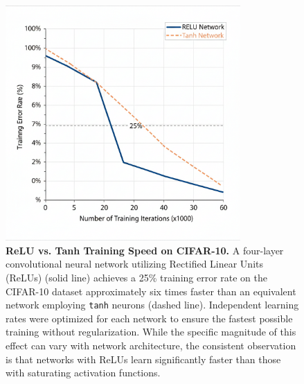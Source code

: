 \documentclass{article}
\begin{document}
\begin{figure}[h!]
    \centering
    \includegraphics[width=0.8\textwidth]{images/reluvstanhplot.png}
    \caption{
        \textbf{ReLU vs. Tanh Training Speed on CIFAR-10.} A four-layer convolutional neural network utilizing Rectified Linear Units (ReLUs) (solid line) achieves a 25\% training error rate on the CIFAR-10 dataset approximately six times faster than an equivalent network employing \texttt{tanh} neurons (dashed line). Independent learning rates were optimized for each network to ensure the fastest possible training without regularization. While the specific magnitude of this effect can vary with network architecture, the consistent observation is that networks with ReLUs learn significantly faster than those with saturating activation functions.
    }
    \label{fig:relu_vs_tanh}
\end{figure}
\end{document}
